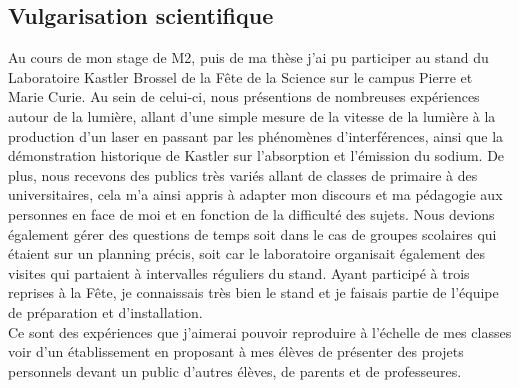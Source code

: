 \documentclass[a4paper,11pt]{article} %
\newcommand{\pointmedian}{\fontfamily{cmr}\selectfont\textperiodcentered}
\begin{document}
	\subsection{Vulgarisation scientifique}
	Au cours de mon stage de M2, puis de ma thèse j'ai pu participer au stand du Laboratoire Kastler Brossel de la Fête de la Science sur le campus Pierre et Marie Curie. Au sein de celui-ci, nous présentions de nombreuses expériences autour de la lumière, allant d'une \textgravedbl simple\textacutedbl{} mesure de la vitesse de la lumière à la production d'un laser en passant par les phénomènes d'interférences, ainsi que la démonstration historique de Kastler sur l'absorption et l'émission du sodium. De plus, nous recevons des publics très variés allant de classes de primaire à des universitaires, cela m'a ainsi appris à adapter mon discours et ma pédagogie aux personnes en face de moi et en fonction de la difficulté des sujets. Nous devions également gérer des questions de temps soit dans le cas de groupes scolaires qui étaient sur un planning précis, soit car le laboratoire organisait également des visites qui partaient à intervalles réguliers du stand. Ayant participé à trois reprises à la Fête, je connaissais très bien le stand et je faisais partie de l'équipe de préparation et d'installation.\\
	
	Ce sont des expériences que j'aimerai pouvoir reproduire à l'échelle de mes classes voir d'un établissement en proposant à mes élèves de présenter des projets personnels devant un public d'autres élèves, de parents et de professeur\pointmedian es.
	
\end{document}
